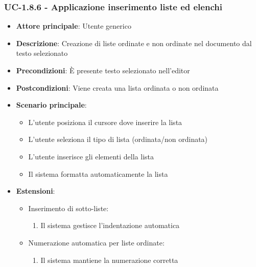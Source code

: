\documentclass[11pt,a4paper]{article}
\begin{document}
\subsubsection{UC-1.8.6 - Applicazione inserimento liste ed elenchi}
\begin{itemize}
    \item \textbf{Attore principale}: Utente generico
    \item \textbf{Descrizione}: Creazione di liste ordinate e non ordinate nel documento dal testo selezionato
    \item \textbf{Precondizioni}: È presente testo selezionato nell’editor
    \item \textbf{Postcondizioni}: Viene creata una lista ordinata o non ordinata
    \item \textbf{Scenario principale}:
        \begin{itemize}
            \item L'utente posiziona il cursore dove inserire la lista
            \item L'utente seleziona il tipo di lista (ordinata/non ordinata)
            \item L'utente inserisce gli elementi della lista
            \item Il sistema formatta automaticamente la lista
        \end{itemize}
    \item \textbf{Estensioni}:
        \begin{itemize}
            \item Inserimento di sotto-liste:
                \begin{enumerate}
                    \item Il sistema gestisce l'indentazione automatica
                \end{enumerate}
            \item Numerazione automatica per liste ordinate:
                \begin{enumerate}
                    \item Il sistema mantiene la numerazione corretta
                \end{enumerate}
        \end{itemize}
\end{itemize}
\end{document}
